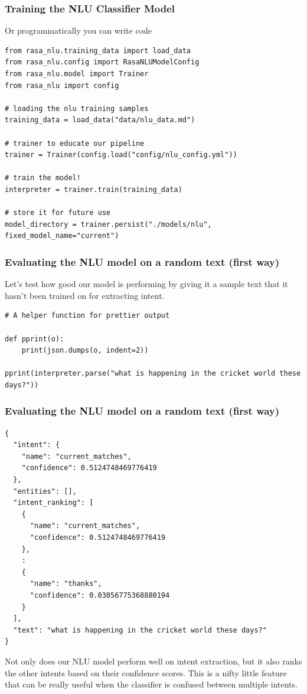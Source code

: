  \begin{frame}[fragile]\frametitle{Training the NLU Classifier Model}
 Or programmatically you can write code
 
\begin{lstlisting}
from rasa_nlu.training_data import load_data
from rasa_nlu.config import RasaNLUModelConfig
from rasa_nlu.model import Trainer
from rasa_nlu import config

# loading the nlu training samples
training_data = load_data("data/nlu_data.md")

# trainer to educate our pipeline
trainer = Trainer(config.load("config/nlu_config.yml"))

# train the model!
interpreter = trainer.train(training_data)

# store it for future use
model_directory = trainer.persist("./models/nlu", fixed_model_name="current")
\end{lstlisting}

\end{frame}

 \begin{frame}[fragile]\frametitle{Evaluating the NLU model on a random text (first way)}
 

Let's test how good our model is performing by giving it a sample text that it hasn't been trained on for extracting intent. 
\begin{lstlisting}
# A helper function for prettier output

def pprint(o):   
    print(json.dumps(o, indent=2))
    
pprint(interpreter.parse("what is happening in the cricket world these days?"))
\end{lstlisting}
 
\end{frame}

 \begin{frame}[fragile]\frametitle{Evaluating the NLU model on a random text (first way)}

\begin{lstlisting}
{
  "intent": {
    "name": "current_matches",
    "confidence": 0.5124748469776419
  },
  "entities": [],
  "intent_ranking": [
    {
      "name": "current_matches",
      "confidence": 0.5124748469776419
    },
	:
    {
      "name": "thanks",
      "confidence": 0.03056775368880194
    }
  ],
  "text": "what is happening in the cricket world these days?"
}
\end{lstlisting}
Not only does our NLU model perform well on intent extraction, but it also ranks the other intents based on their confidence scores. This is a nifty little feature that can be really useful when the classifier is confused between multiple intents.
\end{frame}

